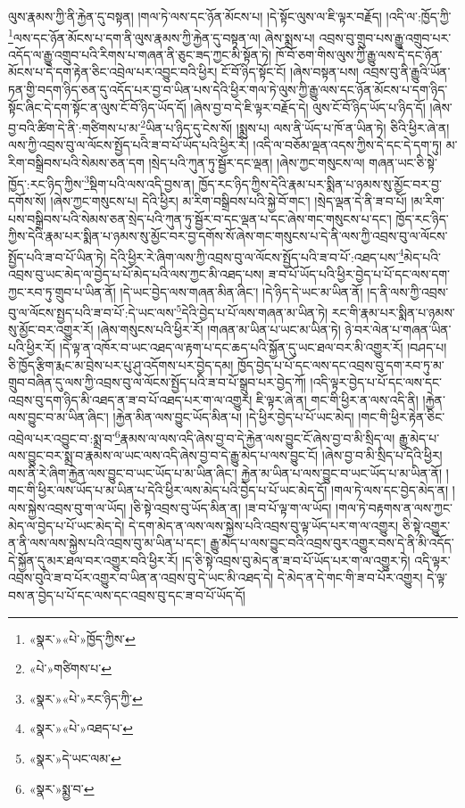 ལུས་རྣམས་ཀྱི་ནི་རྐྱེན་དུ་བསྟན། །གལ་ཏེ་ལས་དང་ཉོན་མོངས་པ། །དེ་སྟོང་ལུས་ལ་ཇི་ལྟར་བརྗོད། །འདི་ལ་:ཁྱོད་ཀྱི་\footnote{«སྣར་»«པེ་»ཁྱོད་ཀྱིས་}ལས་དང་ཉོན་མོངས་པ་དག་ནི་ལུས་རྣམས་ཀྱི་རྐྱེན་དུ་བསྟན་ལ། ཞེས་སྨྲས་པ། འབྲས་བུ་གྲུབ་པས་རྒྱུ་འགྲུབ་པར་འདོད་ལ་རྒྱུ་འགྲུབ་པའི་རིགས་པ་གཞན་ནི་ཅུང་ཟད་ཀྱང་མི་སྟོན་ཏེ། ཁོ་བོ་ཅག་གིས་ལུས་ཀྱི་རྒྱུ་ལས་དེ་དང་ཉོན་མོངས་པ་དེ་དག་རྟེན་ཅིང་འབྲེལ་པར་འབྱུང་བའི་ཕྱིར། ངོ་བོ་ཉིད་སྟོང་ངོ། །ཞེས་བསྟན་པས། འབྲས་བུ་ནི་རྒྱུའི་ཡོན་ཏན་གྱི་བདག་ཉིད་ཅན་དུ་འདོད་པར་བྱ་བ་ཡིན་པས་དེའི་ཕྱིར་གལ་ཏེ་ལུས་ཀྱི་རྒྱུ་ལས་དང་ཉོན་མོངས་པ་དག་ཉིད་སྟོང་ཞིང་དེ་དག་སྟོང་ན་ལུས་ངོ་བོ་ཉིད་ཡོད་དོ། །ཞེས་བྱ་བ་དེ་ཇི་ལྟར་བརྗོད་དེ། ལུས་ངོ་བོ་ཉིད་ཡོད་པ་ཉིད་དོ། །ཞེས་བྱ་བའི་ཚིག་དེ་ནི་:གཙིགས་པ་མ་\footnote{«པེ་»གཙིགས་པ་}ཡིན་པ་ཉིད་དུ་ངེས་སོ། །སྨྲས་པ། ལས་ནི་ཡོད་པ་ཁོ་ན་ཡིན་ཏེ། ཅིའི་ཕྱིར་ཞེ་ན། ལས་ཀྱི་འབྲས་བུ་ལ་ལོངས་སྤྱོད་པའི་ཟ་བ་པོ་ཡོད་པའི་ཕྱིར་རོ། །འདི་ལ་བཅོམ་ལྡན་འདས་ཀྱིས་དེ་དང་དེ་དག་ཏུ། མ་རིག་བསྒྲིབས་པའི་སེམས་ཅན་དག །སྲེད་པའི་ཀུན་ཏུ་སྦྱོར་དང་ལྡན། །ཞེས་ཀྱང་གསུངས་ལ། གཞན་ཡང་ཅི་སྟེ་ཁྱོད་:རང་ཉིད་ཀྱིས་\footnote{«སྣར་»«པེ་»རང་ཉིད་ཀྱི་}སྡིག་པའི་ལས་འདི་བྱས་ན། ཁྱོད་རང་ཉིད་ཀྱིས་དེའི་རྣམ་པར་སྨིན་པ་ཉམས་སུ་མྱོང་བར་བྱ་དགོས་སོ། །ཞེས་ཀྱང་གསུངས་པ། དེའི་ཕྱིར། མ་རིག་བསྒྲིབས་པའི་སྐྱེ་བོ་གང་། །སྲེད་ལྡན་དེ་ནི་ཟ་བ་པོ། །མ་རིག་པས་བསྒྲིབས་པའི་སེམས་ཅན་སྲེད་པའི་ཀུན་ཏུ་སྦྱོར་བ་དང་ལྡན་པ་དང་ཞེས་གང་གསུངས་པ་དང་། ཁྱོད་རང་ཉིད་ཀྱིས་དེའི་རྣམ་པར་སྨིན་པ་ཉམས་སུ་མྱོང་བར་བྱ་དགོས་སོ་ཞེས་གང་གསུངས་པ་དེ་ནི་ལས་ཀྱི་འབྲས་བུ་ལ་ལོངས་སྤྱོད་པའི་ཟ་བ་པོ་ཡིན་ཏེ། དེའི་ཕྱིར་རེ་ཞིག་ལས་ཀྱི་འབྲས་བུ་ལ་ལོངས་སྤྱོད་པའི་ཟ་བ་པོ་:འཐད་པས་\footnote{«སྣར་»«པེ་»འཐད་པ་}མེད་པའི་འབྲས་བུ་ཡང་མེད་ལ་བྱེད་པ་པོ་མེད་པའི་ལས་ཀྱང་མི་འཐད་པས། ཟ་བ་པོ་ཡོད་པའི་ཕྱིར་བྱེད་པ་པོ་དང་ལས་དག་ཀྱང་རབ་ཏུ་གྲུབ་པ་ཡིན་ནོ། །དེ་ཡང་བྱེད་ལས་གཞན་མིན་ཞིང་། །དེ་ཉིད་དེ་ཡང་མ་ཡིན་ནོ། །ད་ནི་ལས་ཀྱི་འབྲས་བུ་ལ་ལོངས་སྤྱད་པའི་ཟ་བ་པོ་:དེ་ཡང་ལས་\footnote{«སྣར་»དེ་ཡང་ལམ་}དེའི་བྱེད་པ་པོ་ལས་གཞན་མ་ཡིན་ཏེ། རང་གི་རྣམ་པར་སྨིན་པ་ཉམས་སུ་མྱོང་བར་འགྱུར་རོ། །ཞེས་གསུངས་པའི་ཕྱིར་རོ། །གཞན་མ་ཡིན་པ་ཡང་མ་ཡིན་ཏེ། ཉེ་བར་ལེན་པ་གཞན་ཡིན་པའི་ཕྱིར་རོ། །དེ་ལྟ་ན་འཁོར་བ་ཡང་འཐད་ལ་རྟག་པ་དང་ཆད་པའི་སྐྱོན་དུ་ཡང་ཐལ་བར་མི་འགྱུར་རོ། །བཤད་པ། ཅི་ཁྱོད་རྩིག་རྨང་མ་བྲེས་པར་པུ་ཤུ་འདོགས་པར་བྱེད་དམ། ཁྱོད་བྱེད་པ་པོ་དང་ལས་དང་འབྲས་བུ་དག་རབ་ཏུ་མ་གྲུབ་བཞིན་དུ་ལས་ཀྱི་འབྲས་བུ་ལ་ལོངས་སྤྱོད་པའི་ཟ་བ་པོ་སྒྲུབ་པར་བྱེད་ཀོ། །འདི་ལྟར་བྱེད་པ་པོ་དང་ལས་དང་འབྲས་བུ་དག་ཉིད་མི་འཐད་ན་ཟ་བ་པོ་འཐད་པར་ག་ལ་འགྱུར། ཇི་ལྟར་ཞེ་ན། གང་གི་ཕྱིར་ན་ལས་འདི་ནི། །རྐྱེན་ལས་བྱུང་བ་མ་ཡིན་ཞིང་། །རྐྱེན་མིན་ལས་བྱུང་ཡོད་མིན་པ། །དེ་ཕྱིར་བྱེད་པ་པོ་ཡང་མེད། །གང་གི་ཕྱིར་རྟེན་ཅིང་འབྲེལ་པར་འབྱུང་བ་:སྨྲ་བ་\footnote{«སྣར་»སྨྱ་བ་}རྣམས་ལ་ལས་འདི་ཞེས་བྱ་བ་དེ་རྐྱེན་ལས་བྱུང་ངོ་ཞེས་བྱ་བ་མི་སྲིད་ལ། རྒྱུ་མེད་པ་ལས་བྱུང་བར་སྨྲ་བ་རྣམས་ལ་ཡང་ལས་འདི་ཞེས་བྱ་བ་དེ་རྒྱུ་མེད་པ་ལས་བྱུང་ངོ། །ཞེས་བྱ་བ་མི་སྲིད་པ་དེའི་ཕྱིར། ལས་ནི་རེ་ཞིག་རྐྱེན་ལས་བྱུང་བ་ཡང་ཡོད་པ་མ་ཡིན་ཞིང་། རྐྱེན་མ་ཡིན་པ་ལས་བྱུང་བ་ཡང་ཡོད་པ་མ་ཡིན་ནོ། །གང་གི་ཕྱིར་ལས་ཡོད་པ་མ་ཡིན་པ་དེའི་ཕྱིར་ལས་མེད་པའི་བྱེད་པ་པོ་ཡང་མེད་དོ། །གལ་ཏེ་ལས་དང་བྱེད་མེད་ན། །ལས་སྐྱེས་འབྲས་བུ་ག་ལ་ཡོད། །ཅི་སྟེ་འབྲས་བུ་ཡོད་མིན་ན། །ཟ་བ་པོ་ལྟ་ག་ལ་ཡོད། །གལ་ཏེ་བརྟགས་ན་ལས་ཀྱང་མེད་ལ་བྱེད་པ་པོ་ཡང་མེད་དེ། དེ་དག་མེད་ན་ལས་ལས་སྐྱེས་པའི་འབྲས་བུ་ལྟ་ཡོད་པར་ག་ལ་འགྱུར། ཅི་སྟེ་འགྱུར་ན་ནི་ལས་ལས་སྐྱེས་པའི་འབྲས་བུ་མ་ཡིན་པ་དང་། རྒྱུ་མེད་པ་ལས་བྱུང་བའི་འབྲས་བུར་འགྱུར་བས་དེ་ནི་མི་འདོད་དེ་སྐྱོན་དུ་མར་ཐལ་བར་འགྱུར་བའི་ཕྱིར་རོ། །ད་ཅི་སྟེ་འབྲས་བུ་མེད་ན་ཟ་བ་པོ་ཡོད་པར་ག་ལ་འགྱུར་ཏེ། འདི་ལྟར་འབྲས་བུའི་ཟ་བ་པོར་འགྱུར་བ་ཡིན་ན་འབྲས་བུ་དེ་ཡང་མི་འཐད་དེ། དེ་མེད་ན་དེ་གང་གི་ཟ་བ་པོར་འགྱུར། དེ་ལྟ་བས་ན་བྱེད་པ་པོ་དང་ལས་དང་འབྲས་བུ་དང་ཟ་བ་པོ་ཡོད་དོ། 